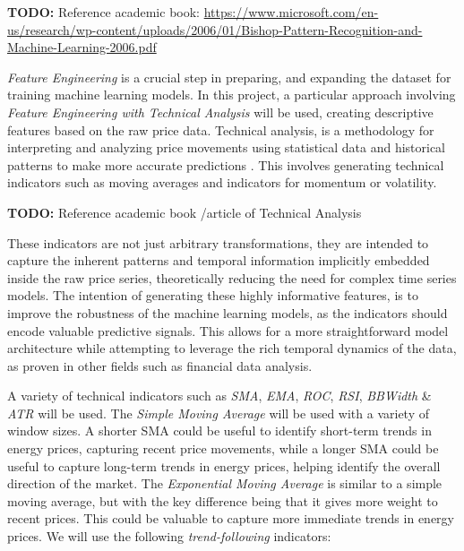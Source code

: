 \documentclass[12pt]{report} %
\begin{document}

\textbf{TODO:} Reference academic book:
\url{https://www.microsoft.com/en-us/research/wp-content/uploads/2006/01/Bishop-Pattern-Recognition-and-Machine-Learning-2006.pdf}

\textit{Feature Engineering} is a crucial step in preparing, and expanding the dataset for training machine learning models. In this project, a particular approach involving \textit{Feature Engineering with Technical Analysis} will be used, creating descriptive features based on the raw price data. Technical analysis, is a methodology for interpreting and analyzing price movements using statistical data and historical patterns to make more accurate predictions \cite{britannica_ta}. This involves generating technical indicators such as moving averages and indicators for momentum or volatility.

\textbf{TODO:} Reference academic book /article of Technical Analysis

These indicators are not just arbitrary transformations, they are intended to capture the inherent patterns and temporal information implicitly embedded inside the raw price series, theoretically reducing the need for complex time series models. The intention of generating these highly informative features, is to improve the robustness of the machine learning models, as the indicators should encode valuable predictive signals. This allows for a more straightforward model architecture while attempting to leverage the rich temporal dynamics of the data, as proven in other fields such as financial data analysis.

A variety of technical indicators such as \textit{SMA}, \textit{EMA}, \textit{ROC}, \textit{RSI}, \textit{BBWidth} \& \textit{ATR} will be used. The \textit{Simple Moving Average} will be used with a variety of window sizes. A shorter SMA could be useful to identify short-term trends in energy prices, capturing recent price movements, while a longer SMA could be useful to capture long-term trends in energy prices, helping identify the overall direction of the market. The \textit{Exponential Moving Average} is similar to a simple moving average, but with the key difference being that it gives more weight to recent prices. This could be valuable to capture more immediate trends in energy prices. We will use the following \textit{trend-following} indicators:
\end{document}
